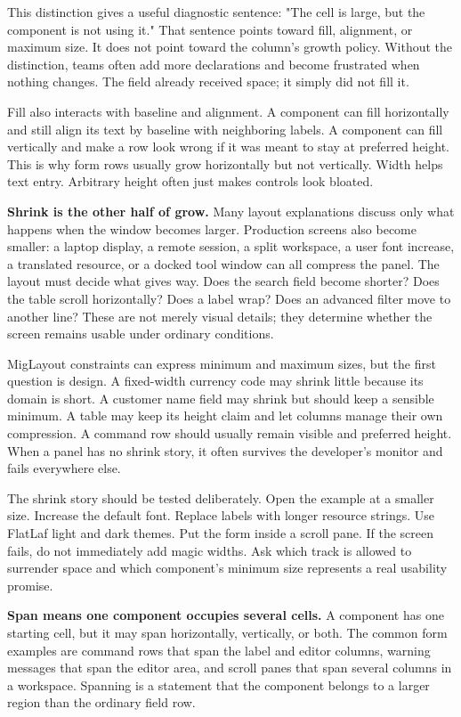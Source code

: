 This distinction gives a useful diagnostic sentence: "The cell is large, but
the component is not using it." That sentence points toward fill, alignment,
or maximum size. It does not point toward the column's growth policy. Without
the distinction, teams often add more  declarations and become
frustrated when nothing changes. The field already received space; it simply
did not fill it.

Fill also interacts with baseline and alignment. A component can fill
horizontally and still align its text by baseline with neighboring labels. A
component can fill vertically and make a row look wrong if it was meant to stay
at preferred height. This is why form rows usually grow horizontally but not
vertically. Width helps text entry. Arbitrary height often just makes controls
look bloated.

\textbf{Shrink is the other half of grow.} Many layout explanations discuss
only what happens when the window becomes larger. Production screens also
become smaller: a laptop display, a remote session, a split workspace, a user
font increase, a translated resource, or a docked tool window can all compress
the panel. The layout must decide what gives way. Does the search field become
shorter? Does the table scroll horizontally? Does a label wrap? Does an
advanced filter move to another line? These are not merely visual details; they
determine whether the screen remains usable under ordinary conditions.

MigLayout constraints can express minimum and maximum sizes, but the first
question is design. A fixed-width currency code may shrink little because its
domain is short. A customer name field may shrink but should keep a sensible
minimum. A table may keep its height claim and let columns manage their own
compression. A command row should usually remain visible and preferred height.
When a panel has no shrink story, it often survives the developer's monitor and
fails everywhere else.

The shrink story should be tested deliberately. Open the example at a smaller
size. Increase the default font. Replace labels with longer resource strings.
Use FlatLaf light and dark themes. Put the form inside a scroll pane. If the
screen fails, do not immediately add magic widths. Ask which track is allowed
to surrender space and which component's minimum size represents a real
usability promise.

\textbf{Span means one component occupies several cells.} A component has one
starting cell, but it may span horizontally, vertically, or both. The common
form examples are command rows that span the label and editor columns, warning
messages that span the editor area, and scroll panes that span several columns
in a workspace. Spanning is a statement that the component belongs to a larger
region than the ordinary field row.

